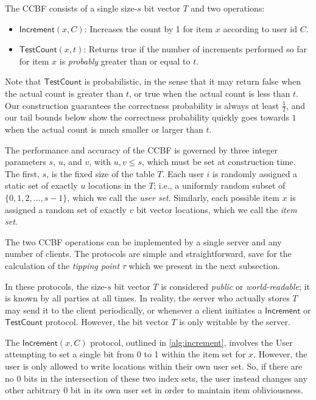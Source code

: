 The CCBF consists of a single size-$s$ bit vector $T$ and two operations:

\newcommand{\Increment}{\ensuremath{\mathsf{Increment}}}
\newcommand{\TestCount}{\ensuremath{\mathsf{TestCount}}}

\begin{itemize}
    \item $\Increment(x, C)$: Increases the count by 1 for item $x$
    according to user id $C$.
    \item $\TestCount(x, t)$: Returns true if the number of increments performed so far for item $x$ is \emph{probably} greater than or equal to $t$.
\end{itemize}

Note that $\TestCount$ is probabilistic, in the sense that it may return false
when the actual count is greater than $t$, or true when the actual count is less
than $t$. Our construction guarantees the correctness probability is always at least
$\tfrac{1}{2}$, and our tail bounds below show the correctness probability quickly
goes towards $1$ when the actual count is much smaller or larger than $t$.

The performance and accuracy of the CCBF is governed by three integer parameters
$s$, $u$, and $v$, with $u,v\le s$,
which must be set at construction time. The first, $s$, is the fixed size of the
table $T$. Each user $i$ is randomly assigned a static set of exactly $u$ locations in
the $T$; i.e., a uniformly random subset of $\{0,1,2,\ldots,s-1\}$, which we
call the \emph{user set}.
Similarly, each possible item $x$ is assigned a random set of exactly $v$
bit vector locations, which we call the \emph{item set}.

The two CCBF operations can be implemented by a single server and any number of clients. The protocols are simple and straightforward, save for the calculation of the \emph{tipping point} $\tau$ which we present in the next subsection.

In these protocols, the size-$s$ bit vector $T$ is considered \emph{public} or \emph{world-readable}; it is known by all parties at all times. In reality, the server who actually stores $T$ may send it to the client periodically, or whenever a client initiates a \Increment{} or \TestCount{} protocol. However, the bit vector $T$ is only writable by the server.

The $\Increment(x,C)$ protocol, outlined in \cref{alg:increment}, involves the User attempting to set a single bit from 0 to 1 within the item set for $x$. However, the user is only allowed to write locations within their own user set. So, if there are no 0 bits in the intersection of these two index sets, the user instead changes any other arbitrary 0 bit in its own user set in order to maintain item obliviousness.

